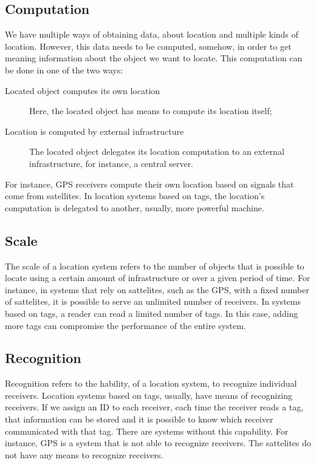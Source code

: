 \subsection{Computation}
\label{sub:background_computation}
We have multiple ways of obtaining data, about location and multiple kinds of location.
However, this data needs to be computed, somehow, in order to get meaning information about the object we want to locate.
This computation can be done in one of the two ways:
\begin{description}
  \item[Located object computes its own location] Here, the located object has means to compute its location itself;
  \item[Location is computed by external infrastructure] The located object delegates its location computation to an external infrastructure, for instance, a central server.
\end{description}

For instance, \gls{GPS} receivers compute their own location based on signals that come from satellites.
In location systems based on tags, the location's computation is delegated to another, usually, more powerful machine.

\subsection{Scale}
\label{sub:background_scale}
The scale of a location system refers to the number of objects that is possible to locate using a certain amount of infrastructure or over a given period of time.
For instance, in systems that rely on sattelites, such as the \gls{GPS}, with a fixed number of sattelites, it is possible to serve an unlimited number of receivers.
In systems based on tags, a reader can read a limited number of tags.
In this case, adding more tags can compromise the performance of the entire system.

\subsection{Recognition}
\label{sub:background_recognition}
Recognition refers to the hability, of a location system, to recognize individual receivers.
Location systems based on tags, usually, have means of recognizing receivers.
If we assign an \gls{ID} to each receiver, each time the receiver reads a tag, that information can be stored and it is possible to know which receiver communicated with that tag.
There are systems without this capability.
For instance, \gls{GPS} is a system that is not able to recognize receivers.
The sattelites do not have any means to recognize receivers.

